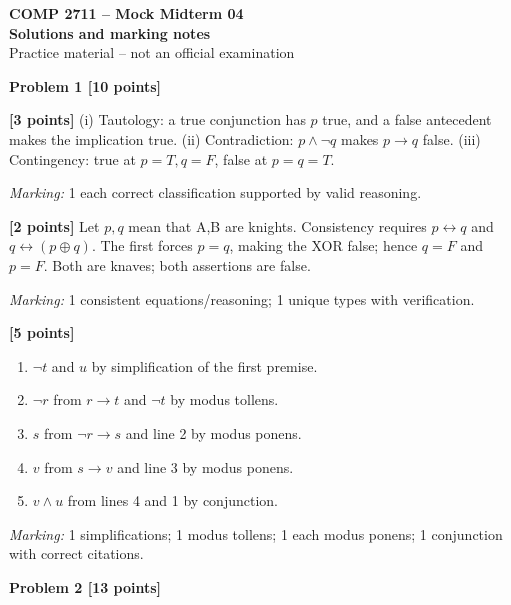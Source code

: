 \documentclass[12pt,letterpaper]{article}
\newcommand{\problemheading}[2][5\baselineskip]{\Needspace{#1}\par\noindent\hspace*{-0.625in}\textbf{#2}\par\nobreak\vspace{0.3em}}
\begin{document}
\begin{center}\textbf{COMP 2711 -- Mock Midterm 04}\\{\large\bfseries Solutions and marking notes}\\Practice material -- not an official examination\end{center}\vspace{0.5em}
\problemheading[\dimexpr 3\baselineskip+4\baselineskip\relax]{Problem 1 [10 points]}
\begin{description}[font=\normalfont,leftmargin=1.2em,labelsep=0.4em]
\item[(a)] \textbf{[3 points]} (i) Tautology: a true conjunction has $p$ true, and a false antecedent makes the implication true. (ii) Contradiction: $p\land\neg q$ makes $p\to q$ false. (iii) Contingency: true at $p=T,q=F$, false at $p=q=T$.
\par\textit{Marking:} 1 each correct classification supported by valid reasoning.
\item[(b)] \textbf{[2 points]} Let $p,q$ mean that A,B are knights. Consistency requires $p\leftrightarrow q$ and $q\leftrightarrow(p\oplus q)$. The first forces $p=q$, making the XOR false; hence $q=F$ and $p=F$. Both are knaves; both assertions are false.
\par\textit{Marking:} 1 consistent equations/reasoning; 1 unique types with verification.
\item[(c)] \textbf{[5 points]} \begin{enumerate}\item $\neg t$ and $u$ by simplification of the first premise.\item $\neg r$ from $r\to t$ and $\neg t$ by modus tollens.\item $s$ from $\neg r\to s$ and line 2 by modus ponens.\item $v$ from $s\to v$ and line 3 by modus ponens.\item $v\land u$ from lines 4 and 1 by conjunction.\end{enumerate}
\par\textit{Marking:} 1 simplifications; 1 modus tollens; 1 each modus ponens; 1 conjunction with correct citations.
\end{description}
\vspace{0.65em}
\problemheading[\dimexpr 3\baselineskip+4\baselineskip\relax]{Problem 2 [13 points]}
\end{document}
